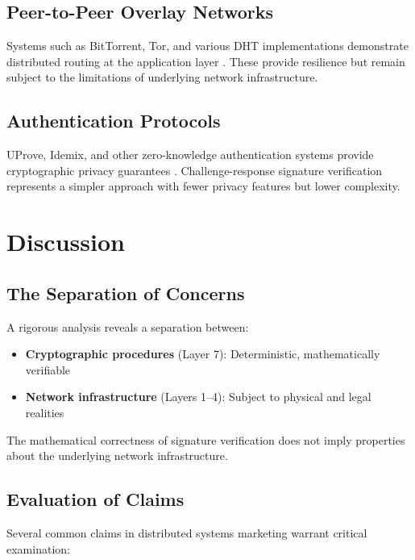 \documentclass[11pt,a4paper]{article}
\begin{document}
\subsection{Peer-to-Peer Overlay Networks}

Systems such as BitTorrent, Tor, and various DHT implementations demonstrate distributed routing at the application layer \citep{maymounkov2002, dingledine2004}. These provide resilience but remain subject to the limitations of underlying network infrastructure.

\subsection{Authentication Protocols}

UProve, Idemix, and other zero-knowledge authentication systems provide cryptographic privacy guarantees \citep{camenisch2001}. Challenge-response signature verification represents a simpler approach with fewer privacy features but lower complexity.

\section{Discussion}

\subsection{The Separation of Concerns}

A rigorous analysis reveals a separation between:
\begin{itemize}[leftmargin=*]
    \item \textbf{Cryptographic procedures} (Layer 7): Deterministic, mathematically verifiable
    \item \textbf{Network infrastructure} (Layers 1--4): Subject to physical and legal realities
\end{itemize}

The mathematical correctness of signature verification does not imply properties about the underlying network infrastructure.

\subsection{Evaluation of Claims}

Several common claims in distributed systems marketing warrant critical examination:
\end{document}
